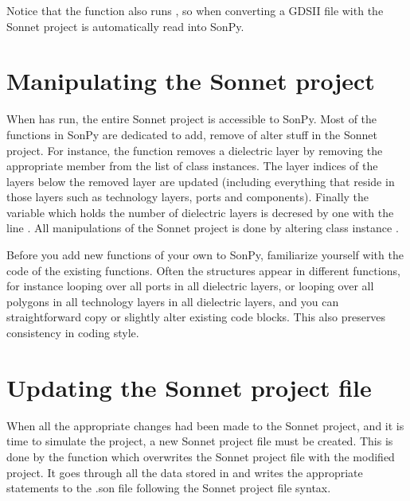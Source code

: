 \documentclass[letterpaper,10pt,english,openany]{sphinxmanual}
\begin{document}
Notice that the function  also runs , so when converting a GDSII file with  the Sonnet project is automatically read into SonPy.


\section{Manipulating the Sonnet project}
\label{\detokenize{source/dev_guide:manipulating-the-sonnet-project}}
When  has run, the entire Sonnet project is accessible to SonPy. Most of the functions in SonPy are dedicated to add, remove of alter stuff in the Sonnet project. For instance, the function  removes a dielectric layer by removing the appropriate member from the list  of  class instances. The layer indices of the layers below the removed layer are updated (including everything that reside in those layers such as technology layers, ports and components). Finally the variable  which holds the number of dielectric layers is decresed by one with the line . All manipulations of the Sonnet project is done by altering  class instance .

Before you add new functions of your own to SonPy, familiarize yourself with the code of the existing functions. Often the structures appear in different functions, for instance looping over all ports in all dielectric layers, or looping over all polygons in all technology layers in all dielectric layers, and you can straightforward copy or slightly alter existing code blocks. This also preserves consistency in coding style.


\section{Updating the Sonnet project file}
\label{\detokenize{source/dev_guide:updating-the-sonnet-project-file}}
When all the appropriate changes had been made to the Sonnet project, and it is time to simulate the project, a new Sonnet project file must be created. This is done by the function  which overwrites the Sonnet project file with the modified project. It goes through all the data stored in  and writes the appropriate statements to the .son file following the Sonnet project file syntax.
\end{document}

